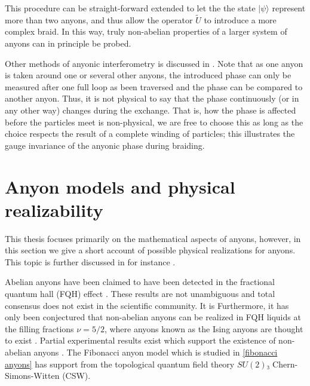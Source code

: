This procedure can be straight-forward extended to let the the state $|ψ⟩$ represent more than two anyons, and thus allow the operator $\widetilde{U}$ to introduce a more complex braid. In this way, truly non-abelian properties of a larger system of anyons can in principle be probed.

Other methods of anyonic interferometry is discussed in \cite{bonderson}. Note that as one anyon is taken around one or several other anyons, the introduced phase can only be measured after one full loop as been traversed and the phase can be compared to another anyon. Thus, it is not physical to say that the phase continuously (or in any other way) changes during the exchange. That is, how the phase is affected before the particles meet is non-physical, we are free to choose this as long as the choice respects the result of a complete winding of particles; this illustrates the gauge invariance of the anyonic phase during braiding.









































\section{Anyon models and physical realizability}\label{sec:models and realizability}

This thesis focuses primarily on the mathematical aspects of anyons, however, in this section we give a short account of possible physical realizations for anyons. This topic is further discussed in for instance \cite{nayak,topological quantum compiling,slingerland bais}.

Abelian anyons have been claimed to have been detected in the fractional quantum hall (FQH) effect \cite{abelian fqh}. These results are not unambiguous and total consensus does not exist in the scientific community. It is  Furthermore, it has only been conjectured that non-abelian anyons can be realized in FQH liquids at the filling fractions $\nu = 5/2$, where anyons known as the Ising anyons are thought to exist \cite{wang book}. Partial experimental results exist which support the existence of non-abelian anyons \cite{non-abelian experimental}. The Fibonacci anyon model which is studied in \cref{fibonacci anyons} has support from the topological quantum field theory $SU(2)₃$ Chern-Simons-Witten (CSW). \cite{nayak}


